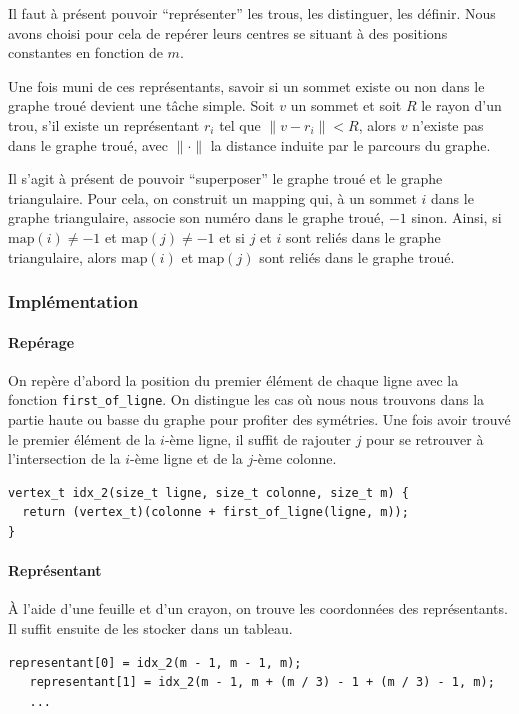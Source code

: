Il faut à présent pouvoir ``représenter'' les trous, les distinguer, les définir.
Nous avons choisi pour cela de repérer leurs centres se situant à des positions constantes en fonction de $m$.

Une fois muni de ces représentants, savoir si un sommet existe ou non dans le graphe troué devient une tâche simple. Soit $v$ un sommet et soit $R$ le rayon d'un trou, s'il existe un représentant $r_i$ tel que $\|v - r_i\| < R$, alors $v$ n'existe pas dans le graphe troué, avec $\|\cdot\|$ la distance induite par le parcours du graphe.

Il s'agit à présent de pouvoir ``superposer'' le graphe troué et le graphe triangulaire.
Pour cela, on construit un mapping qui, à un sommet $i$ dans le graphe triangulaire, associe son numéro dans le graphe troué, $-1$ sinon. Ainsi, si $\text{map}(i) \neq -1$ et $\text{map}(j) \neq -1$ et si $j$ et $i$ sont reliés dans le graphe triangulaire, alors $\text{map}(i)$ et $\text{map}(j)$ sont reliés dans le graphe troué.

\subsubsection*{Implémentation}

\paragraph{Repérage}
On repère d'abord la position du premier élément de chaque ligne avec la fonction \texttt{first\_of\_ligne}. On distingue les cas où nous nous trouvons dans la partie haute ou basse du graphe pour profiter des symétries. Une fois avoir trouvé le premier élément de la $i$-ème ligne, il suffit de rajouter $j$ pour se retrouver à l'intersection de la $i$-ème ligne et de la $j$-ème colonne.

\begin{lstlisting}[style=customc]
vertex_t idx_2(size_t ligne, size_t colonne, size_t m) {
  return (vertex_t)(colonne + first_of_ligne(ligne, m));
}
\end{lstlisting}

\paragraph{Représentant}
À l'aide d'une feuille et d'un crayon, on trouve les coordonnées des représentants. Il suffit ensuite de les stocker dans un tableau.

\begin{lstlisting}[style=customc]
   representant[0] = idx_2(m - 1, m - 1, m);
   representant[1] = idx_2(m - 1, m + (m / 3) - 1 + (m / 3) - 1, m);
   ...
\end{lstlisting}

